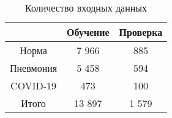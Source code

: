 \begin{table}[H]
    \centering
    \caption{Количество входных данных} \label{inputs}
    \begin{tabular}{|c|c|c|}
      \hline    
                & Обучение  & Проверка  \\
      \hline
      Норма     & 7 966     & 885       \\
      \hline
      Пневмония & 5 458     & 594       \\
      \hline
      COVID-19  & 473       & 100       \\
      \hline
      Итого     & 13 897    & 1 579     \\
      \hline
    \end{tabular}
  \end{table}